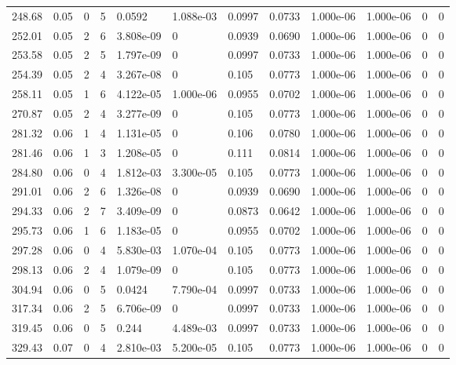 \documentclass[preview]{standalone}
\begin{document}
{{{\begin{tabular}{L{1.2cm}C{1.2cm} C{0.3cm}C{0.5cm} C{1.4cm}C{1.4cm} C{1.4cm}C{1.4cm} C{1.6cm}C{1.6cm} C{1.6cm}C{1.6cm}}
  248.68  &  0.05  & 0     &  5 &  0.0592  & 1.088e-03  &  0.0997&   0.0733& 1.000e-06 & 1.000e-06   &  0 & 0  \\ 
  252.01  &  0.05  & 2     &  6 &  3.808e-09  & 0  &  0.0939&   0.0690& 1.000e-06 & 1.000e-06   &  0 & 0  \\ 
  253.58  &  0.05  & 2     &  5 &  1.797e-09  & 0  &  0.0997&   0.0733& 1.000e-06 & 1.000e-06   &  0 & 0  \\ 
  254.39  &  0.05  & 2     &  4 &  3.267e-08  & 0  &  0.105&   0.0773& 1.000e-06 & 1.000e-06   &  0 & 0  \\ 
  258.11  &  0.05  & 1     &  6 &  4.122e-05  & 1.000e-06  &  0.0955&   0.0702& 1.000e-06 & 1.000e-06   &  0 & 0  \\ 
  270.87  &  0.05  & 2     &  4 &  3.277e-09  & 0  &  0.105&   0.0773& 1.000e-06 & 1.000e-06   &  0 & 0  \\ 
  281.32  &  0.06  & 1     &  4 &  1.131e-05  & 0  &  0.106&   0.0780& 1.000e-06 & 1.000e-06   &  0 & 0  \\ 
  281.46  &  0.06  & 1     &  3 &  1.208e-05  & 0  &  0.111&   0.0814& 1.000e-06 & 1.000e-06   &  0 & 0  \\ 
  284.80  &  0.06  & 0     &  4 &  1.812e-03  & 3.300e-05  &  0.105&   0.0773& 1.000e-06 & 1.000e-06   &  0 & 0  \\ 
  291.01  &  0.06  & 2     &  6 &  1.326e-08  & 0  &  0.0939&   0.0690& 1.000e-06 & 1.000e-06   &  0 & 0  \\ 
  294.33  &  0.06  & 2     &  7 &  3.409e-09  & 0  &  0.0873&   0.0642& 1.000e-06 & 1.000e-06   &  0 & 0  \\ 
  295.73  &  0.06  & 1     &  6 &  1.183e-05  & 0  &  0.0955&   0.0702& 1.000e-06 & 1.000e-06   &  0 & 0  \\ 
  297.28  &  0.06  & 0     &  4 &  5.830e-03  & 1.070e-04  &  0.105&   0.0773& 1.000e-06 & 1.000e-06   &  0 & 0  \\ 
  298.13  &  0.06  & 2     &  4 &  1.079e-09  & 0  &  0.105&   0.0773& 1.000e-06 & 1.000e-06   &  0 & 0  \\ 
  304.94  &  0.06  & 0     &  5 &  0.0424  & 7.790e-04  &  0.0997&   0.0733& 1.000e-06 & 1.000e-06   &  0 & 0  \\ 
  317.34  &  0.06  & 2     &  5 &  6.706e-09  & 0  &  0.0997&   0.0733& 1.000e-06 & 1.000e-06   &  0 & 0  \\ 
  319.45  &  0.06  & 0     &  5 &  0.244  & 4.489e-03  &  0.0997&   0.0733& 1.000e-06 & 1.000e-06   &  0 & 0  \\ 
  329.43  &  0.07  & 0     &  4 &  2.810e-03  & 5.200e-05  &  0.105&   0.0773& 1.000e-06 & 1.000e-06   &  0 & 0  \\ 

\end{tabular}}}}
\end{document}
